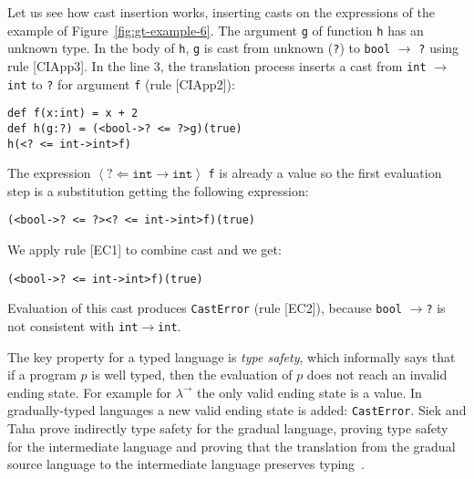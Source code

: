 \documentclass{article}
\newcommand\tcast[2]{\left\langle #1 \Leftarrow #2 \right\rangle }
\newcommand\stlc[0]{$\lambda^{\rightarrow}$}
\newcommand\irname[1]{[#1]}
\newcommand\icode[1]{\texttt{#1}}
\begin{document}
Let us see how cast insertion works, inserting casts on the expressions of the example of Figure~\ref{fig:gt-example-6}. The argument \icode{g} of function \icode{h} has an unknown type. In the body of \icode{h}, \icode{g} is cast from unknown (\icode{?}) to \icode{bool} $\rightarrow$ \icode{?} using rule \irname{CIApp3}. In the line 3, the translation process inserts a cast from \icode{int} $\rightarrow$ \icode{int} to \icode{?} for argument \icode{f} (rule \irname{CIApp2}): 
\begin{lstlisting}
def f(x:int) = x + 2
def h(g:?) = (<bool->? <= ?>g)(true)
h(<? <= int->int>f)
\end{lstlisting}
The expression $\tcast{?}{\icode{int} \rightarrow \icode{int}}$ \icode{f} is already a value so the first evaluation step is a substitution getting the following expression:
\begin{lstlisting}
(<bool->? <= ?><? <= int->int>f)(true)
\end{lstlisting}
We apply rule \irname{EC1} to combine cast and we get:
\begin{lstlisting}
(<bool->? <= int->int>f)(true)
\end{lstlisting}
Evaluation of this cast produces \icode{CastError} (rule \irname{EC2}), because \icode{bool} $\rightarrow $\icode{?} is not consistent with \icode{int}$\rightarrow$\icode{int}.

The key property for a typed language is \emph{type safety}, which informally says that if a program $p$ is well typed, then the evaluation of $p$ does not reach an invalid ending state. For example for \stlc \: the only valid ending state is a value. In gradually-typed languages a new valid ending state is added: \icode{CastError}. Siek and Taha prove indirectly type safety for the gradual language, proving type safety for the intermediate language and proving that the translation from the gradual source language to the intermediate language preserves typing~\cite{siekTaha:sfp2006}.
\end{document}

